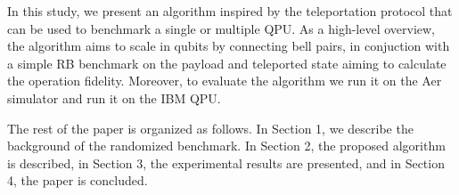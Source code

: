 In this study, we present an algorithm inspired by the teleportation protocol \cite{bennettTeleportingUnknownQuantum_1993} that can be used to benchmark a single or multiple QPU. As a high-level overview, the algorithm aims to scale in qubits by connecting bell pairs, in conjuction with a simple RB benchmark on the payload and teleported state aiming to calculate the operation fidelity. Moreover, to evaluate the algorithm we run it on the Aer simulator and run it on the IBM QPU.



The rest of the paper is organized as follows. In Section 1, we describe the background of the randomized benchmark. In Section 2, the proposed algorithm is described, in Section 3, the experimental results are presented, and in Section 4, the paper is concluded.